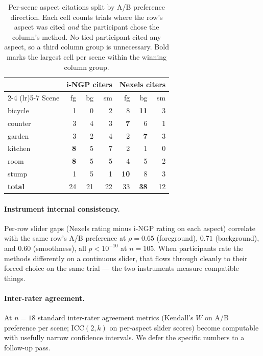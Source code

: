 \begin{table}[h]
\centering
\caption{Per-scene aspect citations split by A/B preference direction.
Each cell counts trials where the row's aspect was cited \emph{and}
the participant chose the column's method. No tied participant cited
any aspect, so a third column group is unnecessary. Bold marks the
largest cell per scene within the winning column group.}
\label{tab:aspect_per_scene}
\small
\begin{tabular}{l@{\quad}rrr@{\quad}rrr}
\toprule
       & \multicolumn{3}{c}{i-NGP citers} & \multicolumn{3}{c}{Nexels citers} \\
\cmidrule(lr){2-4} \cmidrule(lr){5-7}
Scene  & fg & bg & sm & fg & bg & sm \\
\midrule
bicycle & 1 & 0 & 2 & 8 & \textbf{11} & 3 \\
counter & 3 & 4 & 3 & \textbf{7} & 6 & 1 \\
garden  & 3 & 2 & 4 & 2 & \textbf{7} & 3 \\
kitchen & \textbf{8} & 5 & 7 & 2 & 1 & 0 \\
room    & \textbf{8} & 5 & 5 & 4 & 5 & 2 \\
stump   & 1 & 5 & 1 & \textbf{10} & 8 & 3 \\
\midrule
\textbf{total} & 24 & 21 & 22 & 33 & \textbf{38} & 12 \\
\bottomrule
\end{tabular}
\end{table}

\paragraph{Instrument internal consistency.}
Per-row slider gaps (Nexels rating minus i-NGP rating on each aspect)
correlate with the same row's A/B preference at $\rho = 0.65$
(foreground), $0.71$ (background), and $0.60$ (smoothness), all
$p < 10^{-10}$ at $n=105$. When participants rate the methods
differently on a continuous slider, that flows through cleanly to
their forced choice on the same trial --- the two instruments measure
compatible things.

\paragraph{Inter-rater agreement.}
At $n=18$ standard inter-rater agreement metrics (Kendall's $W$ on
A/B preference per scene; ICC$(2,k)$ on per-aspect slider scores)
become computable with usefully narrow confidence intervals. We
defer the specific numbers to a follow-up pass.


